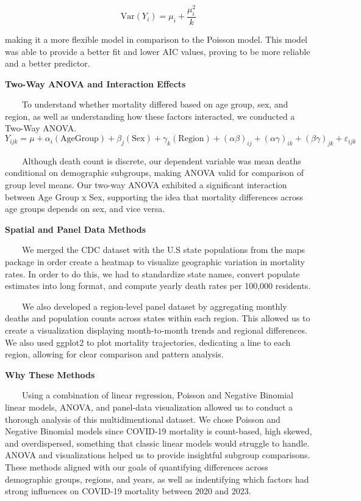 \documentclass[
]{article}
\begin{document}
\[
\text{Var}(Y_i) = \mu_i + \frac{\mu_i^2}{k}
\]

making it a more flexible model in comparison to the Poisson model. This
model was able to provide a better fit and lower AIC values, proving to
be more reliable and a better predictor.

\textbf{Two-Way ANOVA and Interaction Effects}

~~~~To understand whether mortality differed based on age group, sex,
and region, as well as understanding how these factors interacted, we
conducted a Two-Way ANOVA. \[
Y_{ijk} = 
\mu 
+ \alpha_i(\text{AgeGroup}) 
+ \beta_j(\text{Sex}) 
+ \gamma_k(\text{Region}) 
+ (\alpha\beta)_{ij} 
+ (\alpha\gamma)_{ik} 
+ (\beta\gamma)_{jk} 
+ \varepsilon_{ijk}
\]

~~~~Although death count is discrete, our dependent variable was mean
deaths conditional on demographic subgroups, making ANOVA valid for
comparison of group level means. Our two-way ANOVA exhibited a
significant interaction between Age Group x Sex, supporting the idea
that mortality differences across age groups depends on sex, and vice
versa.

\textbf{Spatial and Panel Data Methods}

~~~~We merged the CDC dataset with the U.S state populations from the
maps package in order create a heatmap to visualize geographic variation
in mortality rates. In order to do this, we had to standardize state
names, convert populate estimates into long format, and compute yearly
death rates per 100,000 residents.

~~~~We also developed a region-level panel dataset by aggregating
monthly deaths and population counts across states within each region.
This allowed us to create a visualization displaying month-to-month
trends and regional differences. We also used ggplot2 to plot mortality
trajectories, dedicating a line to each region, allowing for clear
comparison and pattern analysis.

\textbf{Why These Methods}

~~~~Using a combination of linear regression, Poisson and Negative
Binomial linear models, ANOVA, and panel-data visualization allowed us
to conduct a thorough analysis of this multidimentional dataset. We
chose Poisson and Negative Binomial models since COVID-19 mortality is
count-based, high skewed, and overdispersed, something that classic
linear models would struggle to handle. ANOVA and visualizations helped
us to provide insightful subgroup comparisons. These methods aligned
with our goals of quantifying differences across demographic groups,
regions, and years, as well as indentifying which factors had strong
influences on COVID-19 mortality between 2020 and 2023.
\end{document}
